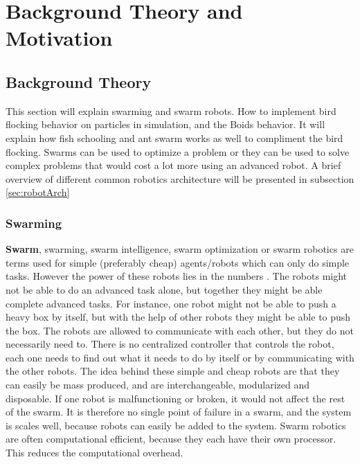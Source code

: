 \chapter{Background Theory and Motivation}
\label{cha:TheoryAndBackground}


\section{Background Theory}
\label{sec:background}
This section will explain swarming and swarm robots. How to implement bird flocking behavior on particles in simulation, and the Boids behavior. It will explain how fish schooling and ant swarm works as well to compliment the bird flocking. Swarms can be used to optimize a problem or they can be used to solve complex problems that would cost a lot more using an advanced robot.
A brief overview of different common robotics architecture will be presented in subsection \ref{sec:robotArch}

\subsection{Swarming}
\textbf{Swarm}, swarming, swarm intelligence, swarm optimization or swarm robotics are terms used for simple (preferably cheap) agents/robots which can only do simple tasks. However the power of these robots lies in the numbers \citep{Zhu2010,Bonabeau1999}. The robots might not be able to do an advanced task alone, but together they might be able complete advanced tasks. For instance, one robot might not be able to push a heavy box by itself, but with the help of other robots they might be able to push the box.
The robots are allowed to communicate with each other, but they do not necessarily need to. There is no centralized controller that controls the robot, each one needs to find out what it needs to do by itself or by communicating with the other robots. The idea behind these simple and cheap robots are that they can easily be mass produced, and are interchangeable, modularized and disposable. If one robot is malfunctioning or broken, it would not affect the rest of the swarm. It is therefore no single point of failure in a swarm, and the system is scales well, because robots can easily be added to the system.
Swarm robotics are often computational efficient, because they each have their own processor. This reduces the computational overhead. 

